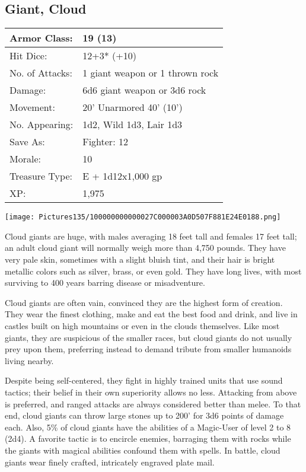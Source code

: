 \documentclass[a4paper,twoside,openany,10pt]{book}
\begin{document}
\begin{multicols}{2}
	



\subsection*{Giant, Cloud}\label{giant-cloud}

\begin{tabularx}{0.48\textwidth}{@{}lX@{}}
Armor Class: & 19 (13) \\\hline
Hit Dice: & 12+3* (+10) \\\hline
No. of Attacks: & 1 giant weapon or 1 thrown rock \\\hline
Damage: & 6d6 giant weapon or 3d6 rock \\\hline
Movement: & 20' Unarmored 40'
(10') \\\hline
No. Appearing: & 1d2, Wild 1d3, Lair 1d3 \\\hline
Save As: & Fighter: 12 \\\hline
Morale: & 10 \\\hline
Treasure Type: & E + 1d12x1,000 gp \\\hline
XP: & 1,975 \\\hline
\end{tabularx}\medskip


\begin{center}
	\texttt{[image: Pictures135/100000000000027C000003A0D507F881E24E0188.png]}
\end{center}

Cloud giants are huge, with males averaging 18 feet tall and females 17 feet tall; an adult cloud giant will normally weigh more than 4,750 pounds. They have very pale skin, sometimes with a slight bluish tint, and their hair is bright metallic colors such as silver, brass, or even gold. They have long lives, with most surviving to 400 years barring disease or misadventure.

Cloud giants are often vain, convinced they are the highest form of creation. They wear the finest clothing, make and eat the best food and drink, and live in castles built on high mountains or even in the clouds themselves. Like most giants, they are suspicious of the smaller races, but cloud giants do not usually prey upon them, preferring instead to demand tribute from smaller humanoids living nearby.

Despite being self-centered, they fight in highly trained units that use sound tactics; their belief in their own superiority allows no less. Attacking from above is preferred, and ranged attacks are always considered better than melee. To that end, cloud giants can throw large stones up to 200' for 3d6 points of damage each. Also, 5\% of cloud giants have the abilities of a Magic-User of level 2 to 8 (2d4). A favorite tactic is to encircle enemies, barraging them with rocks while the giants with magical abilities confound them with spells. In battle, cloud giants wear finely crafted, intricately engraved plate mail.



\end{multicols}
\end{document}
